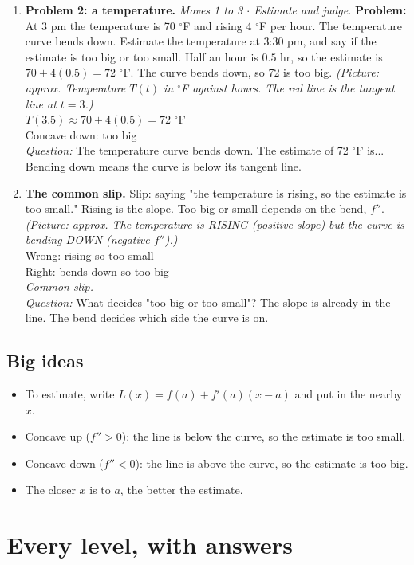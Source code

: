 \documentclass[11pt]{article}
\begin{document}
\begin{enumerate}
\item \textbf{Problem 2: a temperature.} \textit{Moves 1 to 3 $\cdot$ Estimate and judge.} \textbf{Problem:} At 3 pm the temperature is 70 $^\circ$F and rising 4 $^\circ$F per hour. The temperature curve bends down. Estimate the temperature at 3:30 pm, and say if the estimate is too big or too small. Half an hour is $0.5$ hr, so the estimate is $70+4(0.5)=72$ $^\circ$F. The curve bends down, so 72 is too big. \textit{(Picture: approx. Temperature $T(t)$ in $^\circ$F against hours. The red line is the tangent line at $t=3$.)}\\ $T(3.5)\approx70+4(0.5)=72$ $^\circ$F\\ Concave down: too big\\ \textit{Question:} The temperature curve bends down. The estimate of 72 $^\circ$F is...  Bending down means the curve is below its tangent line.
\item \textbf{The common slip.} Slip: saying "the temperature is rising, so the estimate is too small." Rising is the slope. Too big or small depends on the bend, $f''$. \textit{(Picture: approx. The temperature is RISING (positive slope) but the curve is bending DOWN (negative $f''$).)}\\ Wrong: rising so too small\\ Right: bends down so too big\\ \textit{Common slip.}\\ \textit{Question:} What decides "too big or too small"?  The slope is already in the line. The bend decides which side the curve is on.
\end{enumerate}
\subsection*{Big ideas}\begin{itemize}\item To estimate, write $L(x)=f(a)+f'(a)(x-a)$ and put in the nearby $x$.
\item Concave up ($f''>0$): the line is below the curve, so the estimate is too small.
\item Concave down ($f''<0$): the line is above the curve, so the estimate is too big.
\item The closer $x$ is to $a$, the better the estimate.\end{itemize}
\section*{Every level, with answers}
\end{document}
